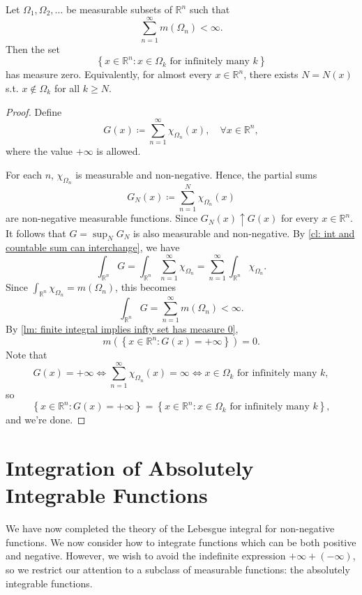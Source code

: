 \begin{lemma}
    Let \(\Omega _1, \Omega _2, \dots \) be measurable subsets of \(\mathbb{R} ^n\) such that
    \[
        \sum_{n=1}^{\infty} m(\Omega _n) < \infty.
    \]
    Then the set 
    \[
        \left\{ x \in \mathbb{R} ^n: x \in \Omega _k \text{ for infinitely many } k  \right\} 
    \]
    has measure zero. Equivalently, for almost every \(x \in \mathbb{R} ^n\), there exists \(N = N(x)\) s.t. \(x \notin \Omega _k\) for all \(k \ge N\).    
\end{lemma}

\begin{proof}
    Define 
    \[
        G(x) \coloneqq \sum_{n=1}^{\infty} \chi _{\Omega _n} (x), \quad \forall x \in \mathbb{R} ^n,
    \]
    where the value \(+ \infty\) is allowed. 

    For each \(n\), \(\chi _{\Omega _n}\) is measurable and non-negative. Hence, the partial sums 
    \[
        G_N(x) \coloneqq \sum_{n=1}^N \chi _{\Omega _n} (x) 
    \]
    are non-negative measurable functions. Since \(G_N(x) \uparrow G(x)\) for every \(x \in \mathbb{R} ^n\). It follows that \(G = \sup _N G_N\) is also measurable and non-negative. By \autoref{cl: int and countable sum can interchange}, we have 
    \[
        \int _{\mathbb{R} ^n} G = \int _{\mathbb{R} ^n} \sum_{n=1}^{\infty} \chi _{\Omega _n} = \sum_{n=1}^{\infty} \int _{\mathbb{R} ^n} \chi _{\Omega _n}.  
    \]   
    Since \(\int _{\mathbb{R} ^n} \chi _{\Omega _n} = m(\Omega _n)\), this becomes
    \[
        \int _{\mathbb{R} ^n} G = \sum_{n=1}^{\infty} m(\Omega _n) < \infty. 
    \] 
    By \autoref{lm: finite integral implies infty set has measure 0}, 
    \[
        m \left( \left\{ x \in \mathbb{R} ^n: G(x) = +\infty \right\}  \right) = 0. 
    \] 
    Note that 
    \[
        G(x) = +\infty \iff \sum_{n=1}^{\infty} \chi _{\Omega _n}(x) = \infty \iff x \in \Omega _k \text{ for infinitely many } k,  
    \]
    so 
    \[
        \left\{ x \in \mathbb{R} ^n: G(x) = +\infty \right\} = \left\{ x \in \mathbb{R} ^n: x \in \Omega _k \text{ for infinitely many } k  \right\}, 
    \]
    and we're done.
\end{proof}

\section{Integration of Absolutely Integrable Functions}
We have now completed the theory of the Lebesgue integral for non-negative functions. We now consider how to integrate functions which can be both positive and negative. However, we wish to avoid the indefinite expression \(+\infty + (- \infty)\), so we restrict our attention to a subclass of measurable functions: the absolutely integrable functions.


